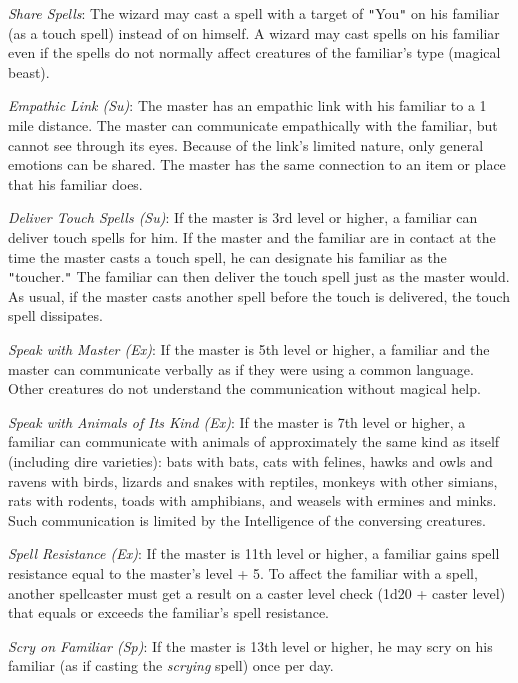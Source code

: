 \textit{Share Spells}: The wizard may cast a spell with a target of \texttt{{}"{}}You\texttt{{}"{}} on his familiar (as a touch spell) instead of on himself. A wizard may cast spells on his familiar even if the spells do not normally affect creatures of the familiar's type (magical beast).
				
\textit{Empathic Link (Su)}: The master has an empathic link with his familiar to a 1 mile distance. The master can communicate empathically with the familiar, but cannot see through its eyes. Because of the link's limited nature, only general emotions can be shared. The master has the same connection to an item or place that his familiar does.
				
\textit{Deliver Touch Spells (Su)}: If the master is 3rd level or higher, a familiar can deliver touch spells for him. If the master and the familiar are in contact at the time the master casts a touch spell, he can designate his familiar as the \texttt{{}"{}}toucher.\texttt{{}"{}} The familiar can then deliver the touch spell just as the master would. As usual, if the master casts another spell before the touch is delivered, the touch spell dissipates.
				
\textit{Speak with Master (Ex)}: If the master is 5th level or higher, a familiar and the master can communicate verbally as if they were using a common language. Other creatures do not understand the communication without magical help.
				
\textit{Speak with Animals of Its Kind (Ex)}: If the master is 7th level or higher, a familiar can communicate with animals of approximately the same kind as itself (including dire varieties): bats with bats, cats with felines, hawks and owls and ravens with birds, lizards and snakes with reptiles, monkeys with other simians, rats with rodents, toads with amphibians, and weasels with ermines and minks. Such communication is limited by the Intelligence of the conversing creatures.
				
\textit{Spell Resistance (Ex)}: If the master is 11th level or higher, a familiar gains spell resistance equal to the master's level + 5. To affect the familiar with a spell, another spellcaster must get a result on a caster level check (1d20 + caster level) that equals or exceeds the familiar's spell resistance.
				
\textit{Scry on Familiar (Sp)}: If the master is 13th level or higher, he may scry on his familiar (as if casting the \textit{scrying }spell) once per day.
				
